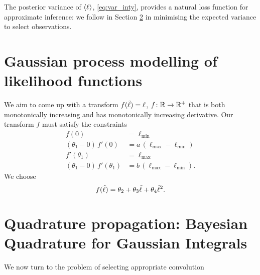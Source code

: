 \documentclass[twoside]{article}
\begin{document}
The posterior variance of $\langle \ell \rangle$, \eqref{eq:var_inty}, provides a natural loss function for approximate inference: we follow \citet{osborne2012active} in Section \ref{sec:active} in minimising the expected variance to select observations. 

\section{Gaussian process modelling of likelihood functions}
We aim to come up with a transform $f({\tilde{\ell}}) = \ell$, $f\colon \mathbb{R} \to \mathbb{R}^+$ that is both monotonically increasing and has monotonically increasing derivative. 
Our transform $f$ must satisfy the constraints
\begin{align}
 f(0) & = \ell_\text{min} \label{eq:f_constraint_1}\\
 (\theta_1 - 0)\, f'(0) & = a\,(\ell_\text{max} - \ell_\text{min}) \label{eq:f_constraint_2}\\
 f'(\theta_1) & = \ell_\text{max} 
\label{eq:f_constraint_3}\\
 (\theta_1 - 0)\, f'(\theta_1) & = b\,(\ell_\text{max} - \ell_\text{min}). 
\label{eq:f_constraint_4}
\end{align}
We choose
\begin{equation}
 f({\tilde{\ell}}) = \theta_2 + \theta_3 {\tilde{\ell}} + \theta_4 {\tilde{\ell}}^2.
\end{equation}




\begin{figure*}
\caption{}
\end{figure*}


\section{Quadrature propagation: Bayesian Quadrature for Gaussian Integrals}
\label{sec:active}

We now turn to the problem of selecting appropriate convolution 



\end{document}
